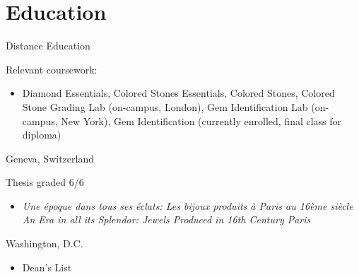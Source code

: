 \section{Education}
 {Distance Education}{}{
  Relevant coursework:
  \begin{itemize}
  \item Diamond Essentials, Colored Stones Essentials, Colored Stones, Colored Stone Grading Lab (on-campus, London), Gem Identification Lab (on-campus, New York), Gem Identification (currently enrolled, final class for diploma)
  \end{itemize}
}
\vspace{1mm}%
 {Geneva, Switzerland}{}{
  Thesis graded 6/6
   \begin{itemize}
   \item \textit {Une \'{e}poque dans tous ses \'{e}clats: Les bijoux produits \`{a} Paris au 16\`{e}me 
     si\`{e}cle} \newline{}%
     \textit {An Era in all its Splendor: Jewels Produced in 16th Century Paris}  
   \end{itemize}
}
\vspace{1mm}%
 {Washington, D.C.}{}{
   \begin{itemize}
   \item Dean's List  
   \end{itemize}
}
